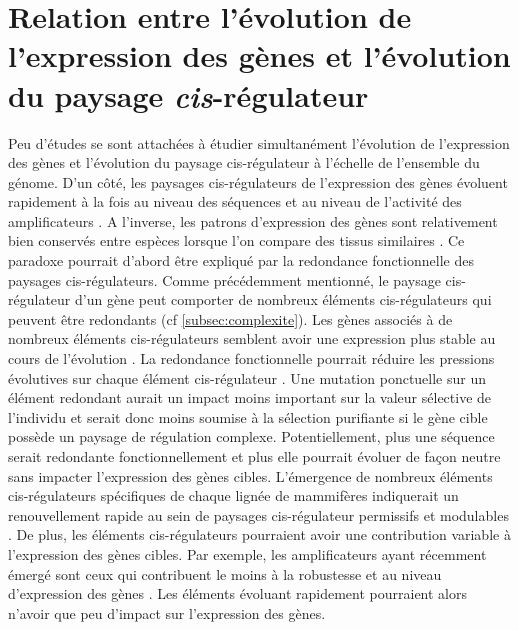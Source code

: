 \section{Relation entre l’évolution de l’expression des gènes et l’évolution du paysage \textit{cis}-régulateur}
\label{sec:relation-paysage-exp}

Peu d’études se sont attachées à étudier simultanément l’évolution de l’expression des gènes et l’évolution du paysage \gls{cis}-régulateur à l’échelle de l’ensemble du génome. D’un côté, les paysages \gls{cis}-régulateurs de l’expression des gènes évoluent rapidement à la fois au niveau des séquences et au niveau de l’activité des \glspl{amplificateur} \citep{cheng_principles_2014, villar_enhancer_2015}. A l'inverse, les patrons d’expression des gènes sont relativement bien conservés entre espèces lorsque l’on compare des tissus similaires \citep{brawand_evolution_2011, necsulea_evolutionary_2014, cardoso-moreira_gene_2019}. Ce paradoxe pourrait d’abord être expliqué par la redondance fonctionnelle des paysages \gls{cis}-régulateurs. Comme précédemment mentionné, le paysage \gls{cis}-régulateur d’un gène peut comporter de nombreux éléments \gls{cis}-régulateurs qui peuvent être redondants (cf \ref{subsec:complexite}). Les gènes associés à de nombreux éléments \gls{cis}-régulateurs semblent avoir une expression plus stable au cours de l’évolution \citep{berthelot_complexity_2018}. La redondance fonctionnelle pourrait réduire les pressions évolutives sur chaque élément \gls{cis}-régulateur \citep{frankel_phenotypic_2010,osterwalder_enhancer_2018, kvon_enhancer_2021}. Une mutation ponctuelle sur un élément redondant aurait un impact moins important sur la valeur sélective de l’individu et serait donc moins soumise à la sélection purifiante si le gène cible possède un paysage de régulation complexe. Potentiellement, plus une séquence serait redondante fonctionnellement et plus elle pourrait évoluer de façon neutre sans impacter l’expression des gènes cibles. L’émergence de nombreux éléments \gls{cis}-régulateurs spécifiques de chaque lignée de mammifères indiquerait un renouvellement rapide au sein de paysages \gls{cis}-régulateur permissifs et modulables \citep{villar_enhancer_2015}. De plus, les éléments \gls{cis}-régulateurs pourraient avoir une contribution variable à l’expression des gènes cibles. Par exemple, les \glspl{amplificateur} ayant récemment émergé sont ceux qui contribuent le moins à la robustesse et au niveau d’expression des gènes \citep{berthelot_complexity_2018}. Les éléments évoluant rapidement pourraient alors n’avoir que peu d’impact sur l’expression des gènes.\\

